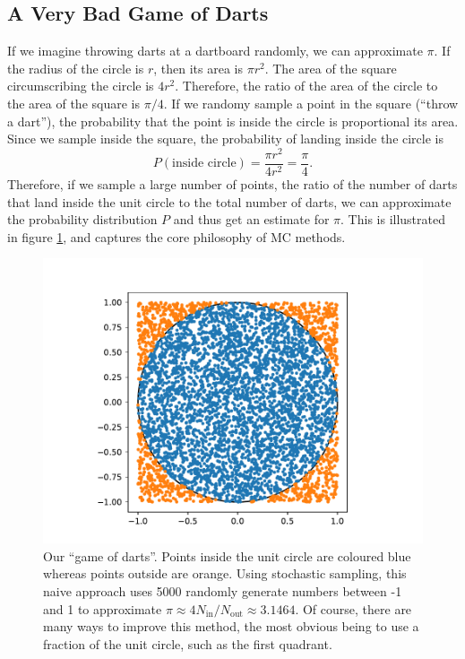 \subsection{A Very Bad Game of Darts}

If we imagine throwing darts at a dartboard randomly, we can approximate $\pi$. If the radius of the circle is $r$, then its area is $\pi r^2$. The area of the square circumscribing the circle is $4r^2$. Therefore, the ratio of the area of the circle to the area of the square is $\pi/4$. If we randomy sample a point in the square (``throw a dart''), the probability that the point is inside the circle is proportional its area. Since we sample inside the square, the probability of landing inside the circle is
\begin{equation}
    P(\text{inside circle}) =  \frac{\pi r^2}{4r^2} = \frac{\pi}{4}.
\end{equation}
Therefore, if we sample a large number of points, the ratio of the number of darts that land inside the unit circle to the total number of darts, we can approximate the probability distribution $P$ and thus get an estimate for $\pi$. This is illustrated in figure \ref{fig:darts}, and captures the core philosophy of \gls{MC} methods.

\begin{figure}[htbp]
    \centering
    \includegraphics[width=\textwidth]{figures/qmc/darts.pdf}
    \caption{Our ``game of darts''. Points inside the unit circle are coloured blue whereas points outside are orange. Using stochastic sampling, this naive approach uses 5000 randomly generate numbers between -1 and 1 to approximate $\pi\approx 4N_\mathrm{in}/N_\mathrm{out}\approx 3.1464$. Of course, there are many ways to improve this method, the most obvious being to use a fraction of the unit circle, such as the first quadrant.}
    \label{fig:darts}
\end{figure}

